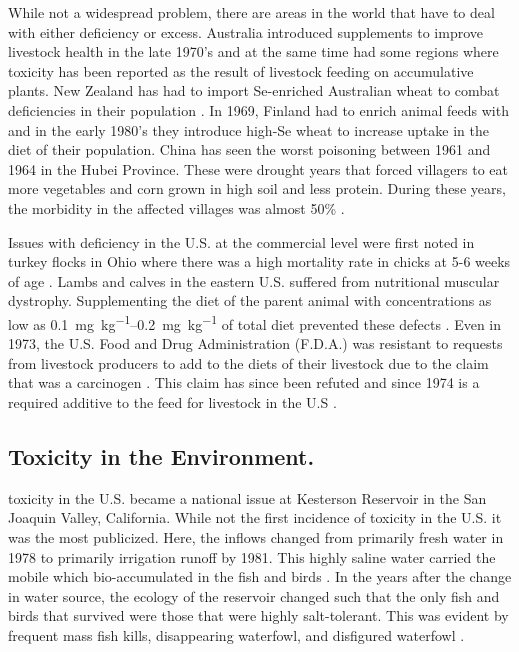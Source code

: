 While not a widespread problem, there are areas in the world that have to deal with either \Se deficiency or excess.  Australia introduced \Se supplements to improve livestock health in the late 1970's and at the same time had some regions where \Se toxicity has been reported as the result of livestock feeding on \Se accumulative plants.  New Zealand has had to import Se-enriched Australian wheat to combat \Se deficiencies in their population \parencite{1996Thomson,Tinggi2003}.  In 1969, Finland had to enrich animal feeds with \Se and in the early 1980's they introduce high-Se wheat to increase \Se uptake in the diet of their population.  China has seen the worst \Se poisoning between 1961 and 1964 in the Hubei Province.  These were drought years that forced villagers to eat more vegetables and corn grown in high \Se soil and less protein.  During these years, the morbidity in the affected villages was almost 50\% \parencite{yang1983}.

Issues with \Se deficiency in the U.S. at the commercial level were first noted in turkey flocks in Ohio where there was a high mortality rate in chicks at 5-6 weeks of age \parencite{scott1967}.  Lambs and calves in the eastern U.S. suffered from nutritional muscular dystrophy.  Supplementing the diet of the parent animal with \Se concentrations as low as \SIrange{0.1}{0.2}{\milli\g\per\kilo\g} of total diet prevented these defects .  Even in 1973, the U.S. Food and Drug Administration (F.D.A.) was resistant to requests from livestock producers to add \Se to the diets of their livestock due to the claim that \Se was a carcinogen \parencite{scott1973}.  This claim has since been refuted and since 1974 \Se is a required additive to the feed for livestock in the U.S \parencite{1999Jensen}.

\subsection*{\Se Toxicity in the Environment.}
\Se toxicity in the U.S. became a national issue at Kesterson Reservoir in the San Joaquin Valley, California.  While not the first incidence of \Se toxicity in the U.S. it was the most publicized.  Here, the inflows changed from primarily fresh water in 1978 to primarily irrigation runoff by 1981.  This highly saline water carried the mobile \selenate which bio-accumulated in the fish and birds \parencite{Besser1989}.  In the years after the change in water source, the ecology of the reservoir changed such that the only fish and birds that survived were those that were highly salt-tolerant.  This was evident by frequent mass fish kills, disappearing waterfowl, and disfigured waterfowl \parencite{Clifton1989,Saiki1993,Hamilton1999,Lemly2002}.

